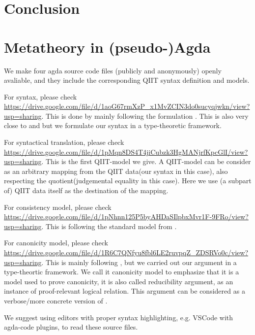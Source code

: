 \section{Conclusion}
\label{sec:conclusion}

\setlength{\bibsep}{.8ex}



\appendix

\section{Metatheory in (pseudo-)Agda}
We make four agda source code files (publicly and anonymously) openly avaliable, and they include the corresponding QIIT syntax definition and models. 

For syntax, please check \\ \href{https://drive.google.com/file/d/1aoG67rmXzP_x1MvZCIN3do0sucyqjwkn/view?usp=sharing}{https://drive.google.com/file/d/1aoG67rmXzP_x1MvZCIN3do0sucyqjwkn/view?usp=sharing}. This is done by mainly following the formulation \citet{altkap2016}. This is also very close to \citet{coquand2018canonicity} and \citet{sterling2019algebraic} but we formulate our syntax in a type-theoretic framework.

For syntactical translation, please check \\ \href{https://drive.google.com/file/d/1pMqn8DS4T4jiCubzk3HgMANjrfKpcGlI/view?usp=sharing}{https://drive.google.com/file/d/1pMqn8DS4T4jiCubzk3HgMANjrfKpcGlI/view?usp=sharing}. This is the first QIIT-model we give. A QIIT-model can be consider as an arbitrary mapping from the QIIT data(our syntax in this case), also respecting the quotient(judgemental equality in this case). Here we use (a subpart of) QIIT data itself as the destination of the mapping. 

For consistency model, please check \\ \href{https://drive.google.com/file/d/1pNhnn125P5byAHDaSIlpbxMvr1F-9FRo/view?usp=sharing}{https://drive.google.com/file/d/1pNhnn125P5byAHDaSIlpbxMvr1F-9FRo/view?usp=sharing}. This is following the standard model from \citet{altkap2016,kaposi2017type,kaposi2019gluing}.

For canonicity model, please check \\ \href{https://drive.google.com/file/d/1R6C7QNfyu8fbl6LE2ruvpqZ_ZDSRVo0c/view?usp=sharing}{https://drive.google.com/file/d/1R6C7QNfyu8fbl6LE2ruvpqZ_ZDSRVo0c/view?usp=sharing}. This is mainly following \citet{coquand2018canonicity,sterling2019algebraic}, but we carried out our argument in a type-theortic framework.  We call it canonicity model to emphasize that it is a model used to prove canonicity, it is also called reducibility argument, as an instance of proof-relevant logical relation. This argument can be considered as a verbose/more concrete version of \citet{kaposi2019gluing}.

We suggest using editors with proper syntax highlighting, e.g. VSCode with agda-code plugins, to read these source files.